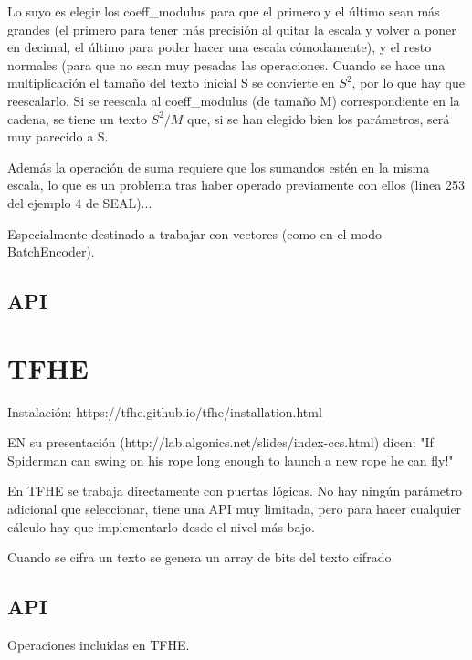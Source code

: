 Lo suyo es elegir los coeff\_modulus para que el primero y el último sean más grandes (el primero para tener más precisión al quitar la escala y volver a poner en decimal, el último para poder hacer una escala cómodamente), y el resto normales (para que no sean muy pesadas las operaciones. Cuando se hace una multiplicación el tamaño del texto inicial S se convierte en $S^2$, por lo que hay que reescalarlo. Si se reescala al coeff\_modulus (de tamaño M) correspondiente en la cadena, se tiene un texto $S^2/M$ que, si se han elegido bien los parámetros, será muy parecido a S.

Además la operación de suma requiere que los sumandos estén en la misma escala, lo que es un problema tras haber operado previamente con ellos (linea 253 del ejemplo 4 de SEAL)...

Especialmente destinado a trabajar con vectores (como en el modo BatchEncoder).

\subsection{API}



\section{TFHE}

Instalación: https://tfhe.github.io/tfhe/installation.html

EN su presentación (http://lab.algonics.net/slides/index-ccs.html) dicen: "If Spiderman can swing on his rope long enough to launch a new rope he can fly!"

En TFHE se trabaja directamente con puertas lógicas. No hay ningún parámetro adicional que seleccionar, tiene una API muy limitada, pero para hacer cualquier cálculo hay que implementarlo desde el nivel más bajo.

Cuando se cifra un texto se genera un array de bits del texto cifrado.

\subsection{API}

Operaciones incluidas en TFHE.

